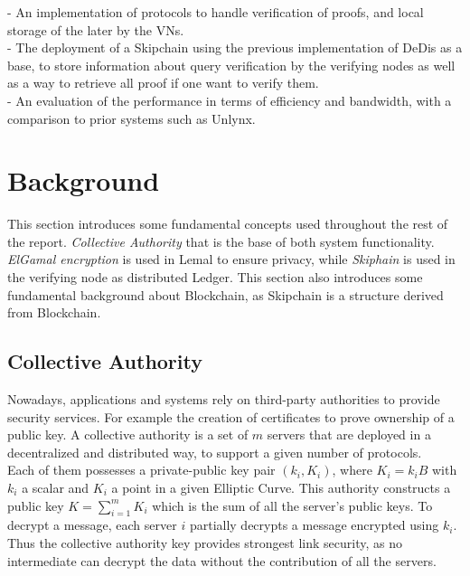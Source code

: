 \documentclass{article}
\begin{document}
- An implementation of protocols to handle verification of proofs, and local storage of the later by the VNs.\\


- The deployment of a Skipchain using the previous implementation of DeDis as a base, to store information about query verification by the verifying nodes as well as a way to retrieve all proof if one want to verify them.\\


- An evaluation of the performance in terms of efficiency and bandwidth, with a comparison to prior systems such as Unlynx.\\
\section{Background}
This section introduces some fundamental concepts used throughout the rest of the report. \textit{Collective Authority} that is the base of both system functionality. \textit{ElGamal encryption} is used in Lemal to ensure privacy, while \textit{Skiphain} is used in the verifying node as distributed Ledger. This section also introduces some fundamental background about Blockchain, as Skipchain is a structure derived from Blockchain.

\subsection{Collective Authority}
Nowadays, applications and systems rely on third-party authorities to provide security services. For example the creation of certificates to prove ownership of a public key. A collective authority is a set of $m$  servers that are deployed in a decentralized and distributed way, to support a given number of protocols.\\
Each of them possesses a private-public key pair $(k_i,K_i)$, where $K_i = k_i B$ with $k_i$ a scalar and $K_i$ a point in a given Elliptic Curve. This authority constructs a public key $K = \sum_{i=1}^{m}{K_i}$ which is the sum of all the server's public keys. To decrypt a message, each server $i$ partially decrypts a message encrypted using $k_{i}$. Thus the collective authority key provides strongest link security, as no intermediate can decrypt the data without the contribution of all the servers.
\end{document}

